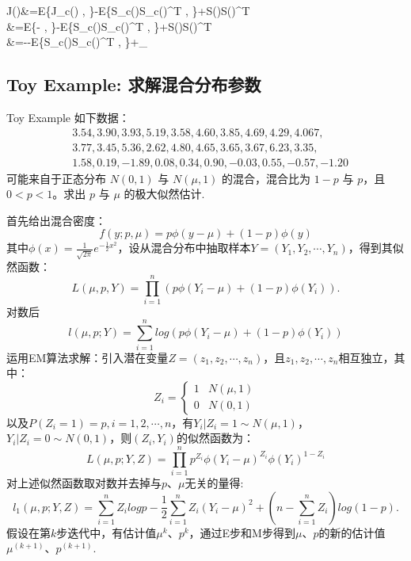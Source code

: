 \documentclass[UTF8,12pt]{ctexart}
\numberwithin{equation}{section}%
\begin{document}
	\begin{DispWithArrows}[tikz=blue,tagged-lines=first]
		J(\boldsymbol{\theta})&=E\{J_c(\boldsymbol{\theta}) \mid {}, \boldsymbol{\theta}\}-E\{S_c(\boldsymbol{\theta})S_c(\boldsymbol{\theta})^T \mid {}, \boldsymbol{\theta} \}+S(\boldsymbol{\theta})S(\boldsymbol{\theta})^T\\
		&=E\{- \mid {}, \boldsymbol{\theta}\}-E\{S_c(\boldsymbol{\theta})S_c(\boldsymbol{\theta})^T \mid {}, \boldsymbol{\theta} \}+S(\boldsymbol{\theta})S(\boldsymbol{\theta})^T \\
		&=--E\{S_c(\boldsymbol{\theta})S_c(\boldsymbol{\theta})^T \mid {}, \boldsymbol{\theta} \}+_{}
	\end{DispWithArrows}
	
	\subsection{Toy Example: 求解混合分布参数}
	
	\begin{ascolorbox1}[求解混合分布参数]{Toy Example}
		如下数据：
		\begin{align*}
			&3.54, 3.90, 3.93, 5.19, 3.58, 4.60, 3.85, 4.69, 4.29, 4.067, \\
			&3.77, 3.45, 5.36, 2.62, 4.80, 4.65, 3.65, 3.67, 6.23, 3.35, \\
			&1.58, 0.19, -1.89, 0.08, 0.34, 0.90, -0.03, 0.55, -0.57, -1.20
		\end{align*}
		可能来自于正态分布 $N(0,1)$ 与 $N(\mu,1)$ 的混合，混合比为 $1-p$ 与 $p$，且 $0<p<1$。求出 $p$ 与 $\mu$ 的极大似然估计.
	\end{ascolorbox1}
	
	首先给出混合密度：
	$$f(y;p,\mu)=p\phi(y-\mu)+(1-p)\phi(y)$$
	 其中$\phi(x)=\frac{1}{\sqrt{2\pi}}e^{-\frac{1}{2}x^2}$，设从混合分布中抽取样本$Y=(Y_1,Y_2,\cdots,Y_n)$，得到其似然函数：
	$$L(\mu,p,Y)=\prod_{i=1}^{n}(p\phi(Y_i-\mu)+(1-p)\phi(Y_i)).$$
	对数后
	$$l(\mu,p;Y)=\sum_{i=1}^{n}log(p\phi(Y_i-\mu)+(1-p)\phi(Y_i))$$
	 运用EM算法求解：引入潜在变量$Z=(z_1,z_2,\cdots,z_n)$，且$z_1,z_2,\cdots,z_n$相互独立，其中：
	$$Z_i=
	\left\{\begin{matrix}
		1& N(\mu,1)\\
		0& N(0,1)
	\end{matrix}\right.
	$$
	 以及$P(Z_i=1)=p,i=1,2,\cdots,n$，有$Y_i|Z_i=1\sim N(\mu,1)$，$Y_i|Z_i=0\sim N(0,1)$，则$(Z_i,Y_i)$的似然函数为：
	$$L(\mu,p;Y,Z)=\prod_{i=1}^{n}p^{Z_i}\phi(Y_i-\mu)^{Z_i}\phi(Y_i)^{1-Z_i}$$
	对上述似然函数取对数并去掉与$p$、$\mu$无关的量得:
	$$l_1(\mu,p;Y,Z)=\sum_{i=1}^{n}Z_ilogp-\frac{1}{2}\sum_{i=1}^{n}Z_i(Y_i-\mu)^2+(n-\sum_{i=1}^{n}Z_i)log(1-p).$$
	假设在第$k$步迭代中，有估计值$\mu^{k}$、$p^{k}$，通过E步和M步得到$\mu$、$p$的新的估计值$\mu^{(k+1)}$、$p^{(k+1)}$.
	
\end{document}
